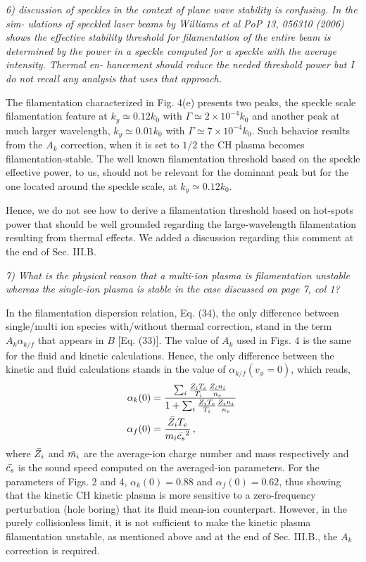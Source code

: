 \documentclass{article}
\begin{document}
\textit{
6) discussion of speckles in the context of plane wave stability is confusing. In the sim-
ulations of speckled laser beams by Williams et al PoP 13, 056310 (2006) shows the
effective stability threshold for filamentation of the entire beam is determined by the
power in a speckle computed for a speckle with the average intensity. Thermal en-
hancement should reduce the needed threshold power but I do not recall any analysis
that uses that approach.}

The filamentation characterized in Fig. 4(e) presents two peaks, the speckle scale filamentation feature at $k_y\simeq 0.12k_0$ with $\Gamma \simeq 2\times 10^{-4}k_0$ and another peak at much larger wavelength, $k_y\simeq 0.01k_0$ with $\Gamma \simeq 7\times 10^{-4}k_0$. Such behavior results from the $A_k$ correction, when it is set to $1/2$ the CH plasma becomes filamentation-stable. 
The well known filamentation threshold based on the speckle effective power, to us, should not be relevant for the dominant peak but for the one located around the speckle scale, at $k_y\simeq 0.12k_0$.

Hence, we do not see how to derive a filamentation threshold based on hot-spots power that should be well grounded regarding the large-wavelength filamentation resulting from thermal effects. We added a discussion regarding this comment at the end of  Sec. III.B.

\textit{
7)   What is the physical reason that a multi-ion plasma is filamentation unstable whereas
the single-ion plasma is stable in the case discussed on page 7, col 1?}

In the filamentation dispersion relation, Eq. (34), the only difference between single/multi ion species with/without thermal correction, stand in the term $A_k\alpha_{k/f}$ that appears in $B$ [Eq. (33)].  
The value    of $A_k$ used in Figs. 4 is the same for the fluid and kinetic calculations. Hence,  
the only difference between 
the kinetic and fluid calculations stands in the value of $\alpha_{k/f}(v_\phi=0)$, which  reads, 
\begin{align}
    \alpha_k(0)& = 
 \frac{\sum_i\frac{  Z_iT_e}{ T_i }\frac{  Z_in_i}{ n_e }   }{ 1+ \sum_i\frac{  Z_iT_e}{ T_i }\frac{ Z_i n_i}{ n_e }  } \, \\
    \alpha_f(0) &=  \frac{\Bar{Z_i} T_e}{m_i\Bar{c_s}^2} \,,
\end{align}
where $\Bar{Z_i} $ and $\Bar{m_i}$ are the average-ion charge number and mass respectively  and $\Bar{c_s}$ is the sound speed computed on the averaged-ion parameters. For the parameters of Figs. 2 and 4, $\alpha_k(0)=0.88$ and $\alpha_f(0)= 0.62$, thus showing that the kinetic CH kinetic plasma is more sensitive to a zero-frequency perturbation (hole boring) that its fluid mean-ion counterpart.  However, in the purely collisionless limit, it is not sufficient to make the kinetic plasma filamentation unstable, as mentioned above and at the end of Sec. III.B., the $A_k$ correction is required. 
\end{document}
